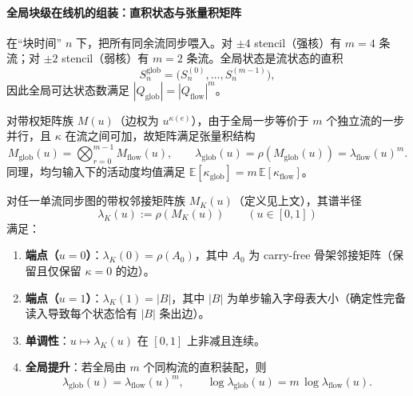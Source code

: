 \paragraph{全局块级在线机的组装：直积状态与张量积矩阵}
在“块时间” $n$ 下，把所有同余流同步喂入。对 $\pm 4$ stencil（强核）有 $m=4$ 条流；对 $\pm 2$ stencil（弱核）有 $m=2$ 条流。全局状态是流状态的直积
\[
S_n^{\mathrm{glob}}=\bigl(S_n^{(0)},\dots,S_n^{(m-1)}\bigr),
\]
因此全局可达状态数满足 $|Q_{\mathrm{glob}}|=|Q_{\mathrm{flow}}|^m$。

对带权矩阵族 $M(u)$（边权为 $u^{\kappa(e)}$），由于全局一步等价于 $m$ 个独立流的一步并行，且 $\kappa$ 在流之间可加，故矩阵满足张量积结构
\[
M_{\mathrm{glob}}(u)=\bigotimes_{r=0}^{m-1} M_{\mathrm{flow}}(u),
\qquad
\lambda_{\mathrm{glob}}(u)=\rho(M_{\mathrm{glob}}(u))=\lambda_{\mathrm{flow}}(u)^m.
\]
同理，均匀输入下的活动度均值满足 $\mathbb{E}[\kappa_{\mathrm{glob}}]=m\,\mathbb{E}[\kappa_{\mathrm{flow}}]$。

\begin{proposition}\label{prop:lambda-endpoints-monotone-uplift}
对任一单流同步图的带权邻接矩阵族 $M_K(u)$（定义见上文），其谱半径
\[
\lambda_K(u):=\rho(M_K(u))\qquad (u\in[0,1])
\]
满足：
\begin{enumerate}
  \item \textbf{端点（$u=0$）}：$\lambda_K(0)=\rho(A_0)$，其中 $A_0$ 为 carry-free 骨架邻接矩阵（保留且仅保留 $\kappa=0$ 的边）。
  \item \textbf{端点（$u=1$）}：$\lambda_K(1)=|B|$，其中 $|B|$ 为单步输入字母表大小（确定性完备读入导致每个状态恰有 $|B|$ 条出边）。
  \item \textbf{单调性}：$u\mapsto \lambda_K(u)$ 在 $[0,1]$ 上非减且连续。
  \item \textbf{全局提升}：若全局由 $m$ 个同构流的直积装配，则
  \[
  \lambda_{\mathrm{glob}}(u)=\lambda_{\mathrm{flow}}(u)^m,
  \qquad
  \log\lambda_{\mathrm{glob}}(u)=m\,\log\lambda_{\mathrm{flow}}(u).
  \]
\end{enumerate}
\end{proposition}

